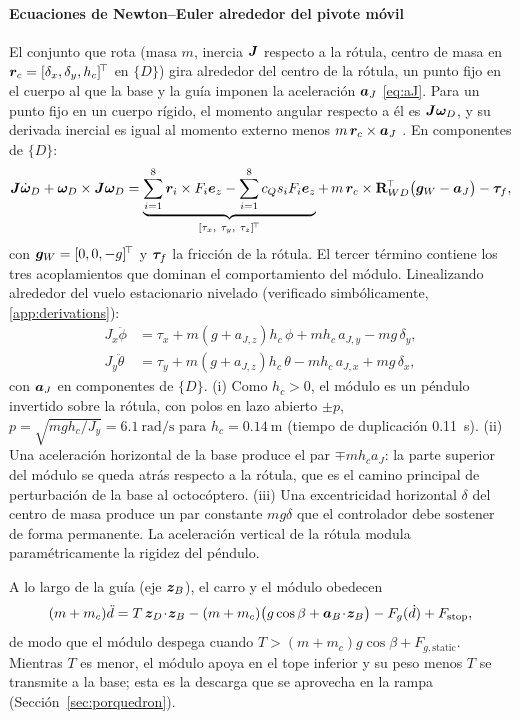 \paragraph{Ecuaciones de Newton--Euler alrededor del pivote móvil}
El conjunto que rota (masa $m$, inercia $\bm{J}$ respecto a la rótula, centro de masa en $\bm{r}_c=[\delta_x,\delta_y,h_c]^{\!\top}$ en $\{D\}$) gira alrededor del centro de la rótula, un punto fijo en el cuerpo al que la base y la guía imponen la aceleración $\bm{a}_J$ \eqref{eq:aJ}. Para un punto fijo en un cuerpo rígido, el momento angular respecto a él es $\bm{J}\bm{\omega}_D$, y su derivada inercial es igual al momento externo menos $m\,\bm{r}_c\times\bm{a}_J$ \cite{ginsberg1998}. En componentes de $\{D\}$:
\begin{equation}
  \bm{J}\dot{\bm{\omega}}_D+\bm{\omega}_D\times\bm{J}\bm{\omega}_D=
  \underbrace{\sum_{i=1}^{8}\bm{r}_i\times F_i\bm{e}_z-\sum_{i=1}^{8}c_Qs_iF_i\bm{e}_z}_{[\tau_x,\ \tau_y,\ \tau_z]^{\!\top}}
  +\,m\,\bm{r}_c\times\mathbf{R}_{WD}^{\!\top}\big(\bm{g}_W-\bm{a}_J\big)-\bm{\tau}_f ,
  \label{eq:euler}
\end{equation}
con $\bm{g}_W=[0,0,-g]^{\!\top}$ y $\bm{\tau}_f$ la fricción de la rótula. El tercer término contiene los tres acoplamientos que dominan el comportamiento del módulo. Linealizando alrededor del vuelo estacionario nivelado (verificado simbólicamente, \ref{app:derivations}):
\begin{align}
  J_x\ddot\phi&=\tau_x+m(g+a_{J,z})h_c\,\phi+m h_c\,a_{J,y}-m g\,\delta_y, \label{eq:rolllin}\\
  J_y\ddot\theta&=\tau_y+m(g+a_{J,z})h_c\,\theta-m h_c\,a_{J,x}+m g\,\delta_x, \label{eq:pitchlin}
\end{align}
con $\bm{a}_J$ en componentes de $\{D\}$. (i) Como $h_c>0$, el módulo es un péndulo invertido sobre la rótula, con polos en lazo abierto $\pm p$, $p=\sqrt{mgh_c/J_y}=\SI{6.1}{\radian\per\second}$ para $h_c=\SI{0.14}{\metre}$ (tiempo de duplicación \SI{0.11}{\second}). (ii) Una aceleración horizontal de la base produce el par $\mp mh_ca_J$: la parte superior del módulo se queda atrás respecto a la rótula, que es el camino principal de perturbación de la base al octocóptero. (iii) Una excentricidad horizontal $\delta$ del centro de masa produce un par constante $mg\delta$ que el controlador debe sostener de forma permanente. La aceleración vertical de la rótula modula paramétricamente la rigidez del péndulo.

A lo largo de la guía (eje $\bm{z}_B$), el carro y el módulo obedecen
\begin{equation}
  (m+m_c)\ddot d=T\,\bm{z}_D\!\cdot\!\bm{z}_B-(m+m_c)\big(g\cos\beta+\bm{a}_B\!\cdot\!\bm{z}_B\big)-F_g(\dot d)+F_{\mathrm{stop}},
  \label{eq:guide}
\end{equation}
de modo que el módulo despega cuando $T>(m+m_c)g\cos\beta+F_{g,\mathrm{static}}$. Mientras $T$ es menor, el módulo apoya en el tope inferior y su peso menos $T$ se transmite a la base; esta es la descarga que se aprovecha en la rampa (Sección~\ref{sec:porquedron}).


